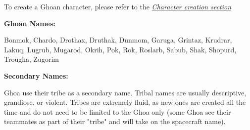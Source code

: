 To create a Ghoan character, please refer to the \textit{\hyperref[sec:rules-creation]{Character creation section}}

\textbf{Ghoan Names:}

Bonmok, Chardo, Drothax, Druthak, Dunmom, Garuga, Grintaz, Krudrar, Lakuq, Lugrub, Mugarod, Okrih, Pok, Rok, Roslarb, Sabub, Shak, Shopurd, Trougha, Zugorim

\textbf{Secondary Names:}

Ghoa use their tribe as a secondary name. Tribal names are usually descriptive, grandiose, or violent. Tribes are extremely fluid, as new ones are created all the time and do not need to be limited to the Ghoa only (some Ghoa see their teammates as part of their "tribe" and will take on the spacecraft name).
